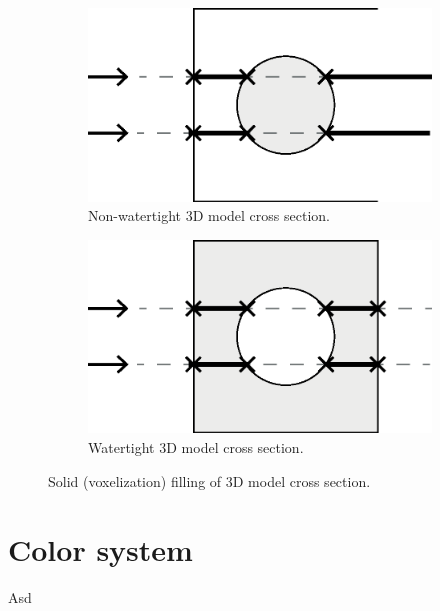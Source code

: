 \begin{figure}[h]
    \centering
    \begin{subfigure}[b]{0.45\textwidth}
        \centering
        \includegraphics[width=\textwidth]{sections/methodology/figures/solid-non-watertight}
        \caption{Non-watertight 3D model cross section.}
        \label{fig:filling-non-watertight-model}
    \end{subfigure}
    \hfill
    \begin{subfigure}[b]{0.45\textwidth}
        \centering
        \includegraphics[width=\textwidth]{sections/methodology/figures/solid-watertight}
        \caption{Watertight 3D model cross section.}
        \label{fig:filling-watertight-model}
    \end{subfigure}
       \caption{Solid (voxelization) filling of 3D model cross section.}
       \label{fig:filling-3d-model}
\end{figure}


\section{Color system}
Asd

